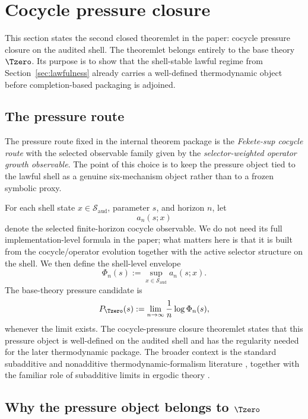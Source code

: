 \section{Cocycle pressure closure}\label{sec:cocycle-pressure}

This section states the second closed theoremlet in the paper: cocycle pressure closure on the audited shell. The theoremlet belongs entirely to the base theory \(\Tzero\). Its purpose is to show that the shell-stable lawful regime from Section~\ref{sec:lawfulness} already carries a well-defined thermodynamic object before completion-based packaging is adjoined.

\subsection{The pressure route}

The pressure route fixed in the internal theorem package is the \emph{Fekete-sup cocycle route} \cite{Fekete1923DistributionRoots} with the selected observable family given by the \emph{selector-weighted operator growth observable}. The point of this choice is to keep the pressure object tied to the lawful shell as a genuine six-mechanism object rather than to a frozen symbolic proxy.

For each shell state \(x\in\mathcal{S}_{\mathrm{aud}}\), parameter \(s\), and horizon \(n\), let
\[
a_n(s;x)
\]
denote the selected finite-horizon cocycle observable. We do not need its full implementation-level formula in the paper; what matters here is that it is built from the cocycle/operator evolution together with the active selector structure on the shell. We then define the shell-level envelope
\[
\Phi_n(s):=\sup_{x\in\mathcal{S}_{\mathrm{aud}}} a_n(s;x).
\]
The base-theory pressure candidate is
\[
P_{\Tzero}(s):=\lim_{n\to\infty}\frac{1}{n}\log \Phi_n(s),
\]
whenever the limit exists. The cocycle-pressure closure theoremlet states that this pressure object is well-defined on the audited shell and has the regularity needed for the later thermodynamic package. The broader context is the standard subadditive and nonadditive thermodynamic-formalism literature \cite{BarreiraNonadditiveTF,CaoFengHuang2008SubAdditive,Mummert2006AlmostAdditive}, together with the familiar role of subadditive limits in ergodic theory \cite{Kingman1968Subadditive}.

\subsection{Why the pressure object belongs to \texorpdfstring{$\Tzero$}{T0}}

